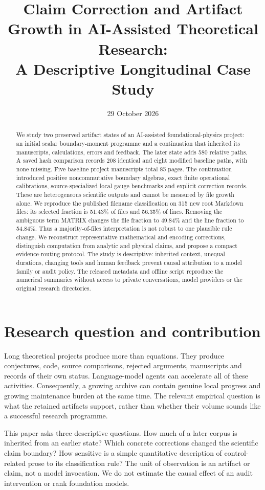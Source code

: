 \documentclass[11pt,a4paper]{article}
\title{Claim Correction and Artifact Growth in AI-Assisted Theoretical Research:\\ A Descriptive Longitudinal Case Study}
\author{}
\date{29 October 2026}
\begin{document}
\maketitle
\begin{abstract}
We study two preserved artifact states of an AI-assisted foundational-physics
project: an initial scalar boundary-moment programme and a continuation that
inherited its manuscripts, calculations, errors and feedback. The later state
adds 580 relative paths. A saved hash comparison records 208 identical and eight
modified baseline paths, with none missing. Five baseline project manuscripts
total 85 pages. The continuation introduced positive noncommutative boundary
algebras, exact finite operational calibrations, source-specialized local gauge
benchmarks and explicit correction records. These are heterogeneous scientific
outputs and cannot be measured by file growth alone.
We reproduce the published filename classification on 315 new root Markdown
files: its selected fraction is 51.43\% of files and 56.35\% of lines. Removing
the ambiguous term MATRIX changes the file fraction to 49.84\% and the line
fraction to 54.84\%. Thus a majority-of-files interpretation is not robust to
one plausible rule change. We reconstruct representative mathematical and
encoding corrections, distinguish computation from analytic and physical
claims, and propose a compact evidence-routing protocol. The study is
descriptive: inherited context, unequal durations, changing tools and human
feedback prevent causal attribution to a model family or audit policy.
The released metadata and offline script reproduce the numerical summaries
without access to private conversations, model providers or the original
research directories.
\end{abstract}

\section{Research question and contribution}
Long theoretical projects produce more than equations. They produce conjectures,
code, source comparisons, rejected arguments, manuscripts and records of their
own status. Language-model agents can accelerate all of these activities.
Consequently, a growing archive can contain genuine local progress and growing
maintenance burden at the same time. The relevant empirical question is what
the retained artifacts support, rather than whether their volume sounds like
a successful research programme.

This paper asks three descriptive questions. How much of a later corpus is
inherited from an earlier state? Which concrete corrections changed the
scientific claim boundary? How sensitive is a simple quantitative description
of control-related prose to its classification rule? The unit of observation
is an artifact or claim, not a model invocation. We do not estimate the causal
effect of an audit intervention or rank foundation models.
\end{document}
